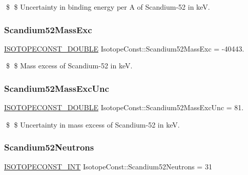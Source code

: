 \$ \$ Uncertainty in binding energy per A of Scandium-\/52 in keV. \mbox{\label{group___isotope_const-_scandium-_sc52_ga37c8fc3bccca3d8b7cbdc154c278579d}} 
\subsubsection{\texorpdfstring{Scandium52\+Mass\+Exc}{Scandium52MassExc}}
{\footnotesize\ttfamily \mbox{\hyperlink{group___isotope_const-_macros_ga8f45a7272ce02c0b4c65c44636ed719a}{I\+S\+O\+T\+O\+P\+E\+C\+O\+N\+S\+T\+\_\+\+D\+O\+U\+B\+LE}} Isotope\+Const\+::\+Scandium52\+Mass\+Exc = -\/40443.}

\$ \$ Mass excess of Scandium-\/52 in keV. \mbox{\label{group___isotope_const-_scandium-_sc52_gac31b007e53a7e8e8aa897493b3456b78}} 
\subsubsection{\texorpdfstring{Scandium52\+Mass\+Exc\+Unc}{Scandium52MassExcUnc}}
{\footnotesize\ttfamily \mbox{\hyperlink{group___isotope_const-_macros_ga8f45a7272ce02c0b4c65c44636ed719a}{I\+S\+O\+T\+O\+P\+E\+C\+O\+N\+S\+T\+\_\+\+D\+O\+U\+B\+LE}} Isotope\+Const\+::\+Scandium52\+Mass\+Exc\+Unc = 81.}

\$ \$ Uncertainty in mass excess of Scandium-\/52 in keV. \mbox{\label{group___isotope_const-_scandium-_sc52_gaacc26cc2297fa3357f77abb01b103eb4}} 
\subsubsection{\texorpdfstring{Scandium52\+Neutrons}{Scandium52Neutrons}}
{\footnotesize\ttfamily \mbox{\hyperlink{group___isotope_const-_macros_ga5f18360b3e99483a35c32d789e62621c}{I\+S\+O\+T\+O\+P\+E\+C\+O\+N\+S\+T\+\_\+\+I\+NT}} Isotope\+Const\+::\+Scandium52\+Neutrons = 31}

